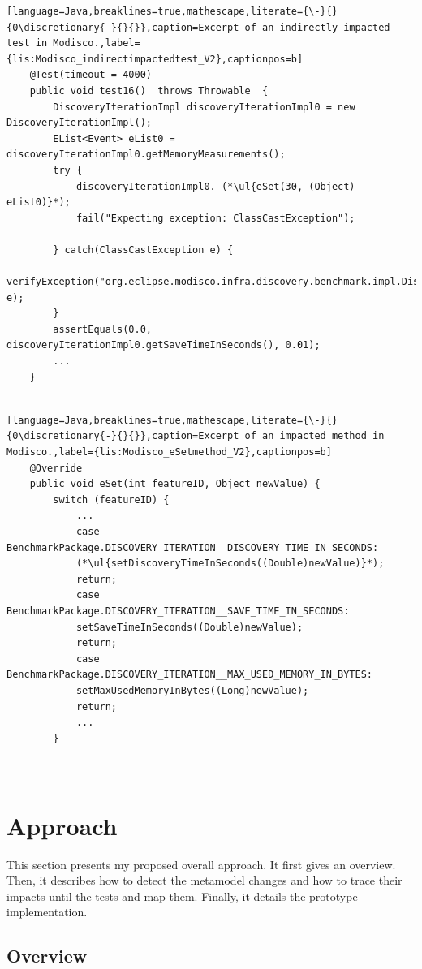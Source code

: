 \begin{lstlisting}[language=Java,breaklines=true,mathescape,literate={\-}{}{0\discretionary{-}{}{}},caption=Excerpt of an indirectly impacted test in Modisco.,label={lis:Modisco_indirectimpactedtest_V2},captionpos=b]
	@Test(timeout = 4000)
	public void test16()  throws Throwable  {
		DiscoveryIterationImpl discoveryIterationImpl0 = new DiscoveryIterationImpl();
		EList<Event> eList0 = discoveryIterationImpl0.getMemoryMeasurements();
		try { 
			discoveryIterationImpl0. (*\ul{eSet(30, (Object) eList0)}*);
			fail("Expecting exception: ClassCastException");
			
		} catch(ClassCastException e) {
			verifyException("org.eclipse.modisco.infra.discovery.benchmark.impl.DiscoveryIterationImpl", e);
		}
		assertEquals(0.0, discoveryIterationImpl0.getSaveTimeInSeconds(), 0.01);
		...
	}
	
\end{lstlisting}



\begin{lstlisting}[language=Java,breaklines=true,mathescape,literate={\-}{}{0\discretionary{-}{}{}},caption=Excerpt of an impacted method in Modisco.,label={lis:Modisco_eSetmethod_V2},captionpos=b]
	@Override
	public void eSet(int featureID, Object newValue) {
		switch (featureID) {
			...
			case BenchmarkPackage.DISCOVERY_ITERATION__DISCOVERY_TIME_IN_SECONDS:
			(*\ul{setDiscoveryTimeInSeconds((Double)newValue)}*);
			return;
			case BenchmarkPackage.DISCOVERY_ITERATION__SAVE_TIME_IN_SECONDS:
			setSaveTimeInSeconds((Double)newValue);
			return;
			case BenchmarkPackage.DISCOVERY_ITERATION__MAX_USED_MEMORY_IN_BYTES:
			setMaxUsedMemoryInBytes((Long)newValue);
			return;
			...
		}
		
		
	\end{lstlisting}
	
\section{Approach}
\label{sec_approach}
This section presents my proposed overall approach. It first gives an overview. Then, it describes how to detect the metamodel changes and how to trace their impacts until the tests and map them. Finally, it details the prototype implementation. 




\subsection{Overview}

